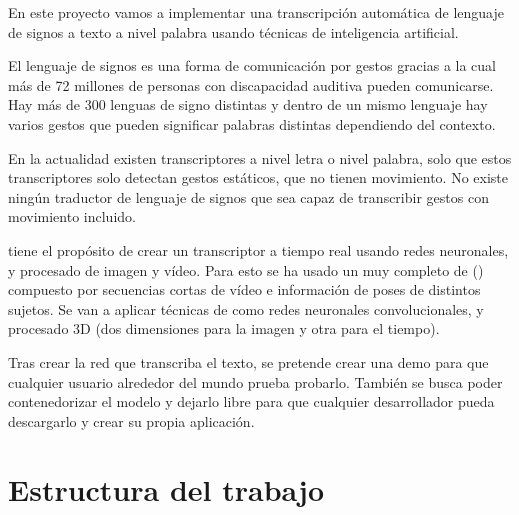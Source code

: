 
En este proyecto vamos a implementar una transcripción automática de lenguaje de signos a texto a nivel palabra usando técnicas de inteligencia artificial.

El lenguaje de signos es una forma de comunicación por gestos gracias a la cual más de 72 millones de personas con discapacidad auditiva pueden comunicarse. Hay más de 300 lenguas de signo distintas y dentro de un mismo lenguaje hay varios gestos que pueden significar palabras distintas dependiendo del contexto.

En la actualidad existen transcriptores a nivel letra o nivel palabra, solo que estos transcriptores solo detectan gestos estáticos, que no tienen movimiento. No existe ningún traductor de lenguaje de signos que sea capaz de transcribir gestos con movimiento incluido.

 tiene el propósito de crear un transcriptor a tiempo real usando redes neuronales,  y procesado de imagen y vídeo. Para esto se ha usado un  muy completo de  ()  compuesto por secuencias cortas de vídeo e información de poses de distintos sujetos. Se van a aplicar técnicas de  como redes neuronales convolucionales,  y procesado 3D (dos dimensiones para la imagen y otra para el tiempo).

Tras crear la red que transcriba el texto, se pretende crear una demo  para que cualquier usuario alrededor del mundo prueba probarlo. También se busca poder contenedorizar el modelo y dejarlo libre para que cualquier desarrollador pueda descargarlo y crear su propia aplicación.

\section{Estructura del trabajo}

